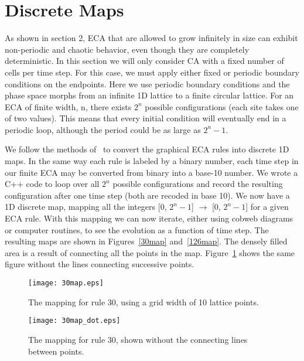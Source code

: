 \section{Discrete Maps}


As shown in section 2, ECA that are allowed to grow infinitely in size can exhibit non-periodic and chaotic behavior, even though they are completely deterministic.   In this section we will only consider CA with a fixed number of cells per time step.  For this case, we must apply either fixed or periodic boundary conditions on the endpoints.  Here we use periodic boundary conditions and the phase space morphs from an infinite 1D lattice to a finite circular lattice.  For an ECA of finite width, n, there exists $2^n$ possible configurations (each site takes one of two values).  This means that every initial condition will eventually end in a periodic loop, although the period could be as large as $2^n -1$.  

We follow the methods of~\cite{sed} to convert the graphical ECA rules into discrete 1D maps.  In the same way each rule is labeled by a binary number, each time step in our finite ECA may be converted from binary into a base-10 number.  We wrote a \textsc{C++} code to loop over all $2^n$ possible configurations and record the resulting configuration after one time step (both are recoded in base 10).  We now have a 1D discrete map, mapping all the integers [0, $2^n -1$] $\rightarrow$ [0, $2^n -1$] for a given ECA rule.  With this mapping we can now iterate, either using cobweb diagrams or computer routines, to see the evolution as a function of time step.  The resulting maps are shown in Figures~\ref{30map} and~\ref{126map}.  The densely filled area is a result of connecting all the points in the map.  Figure~\ref{30map_dot} shows the same figure without the  lines connecting successive points.  

\begin{figure}
    \begin{minipage}[b]{0.49\textwidth}
        \centering
        \texttt{[image: 30map.eps]}
        \caption{\label{30map} The mapping for rule 30, using a grid width of 10 lattice points.  }
    \end{minipage}
    \hspace{0.5cm}
    \begin{minipage}[b]{0.49\textwidth}
        \centering
        \texttt{[image: 30map\_dot.eps]}
        \caption{\label{30map_dot} The mapping for rule 30, shown without the connecting lines between points.}
    \end{minipage}
\end{figure}

